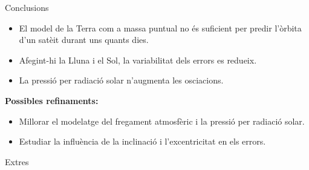 \documentclass{beamer} %
\begin{document}
\begin{frame}{Conclusions}
  \begin{itemize}
    \item El model de la Terra com a massa puntual no és suficient per predir l'òrbita d'un satè\lgem it durant uns quants dies.
    \item Afegint-hi la Lluna i el Sol, la variabilitat dels errors es redueix.
    \item La pressió per radiació solar n'augmenta les osci\lgem acions.
  \end{itemize}
  \vspace{0.5cm}\pause
  \textbf{Possibles refinaments:}
  \begin{itemize}
    \item Millorar el modelatge del fregament atmosfèric i la pressió per radiació solar.
    \item Estudiar la influència de la inclinació i l'excentricitat en els errors.
  \end{itemize}
\end{frame}
\begin{frame}{Extres}

\end{frame}
\end{document}
